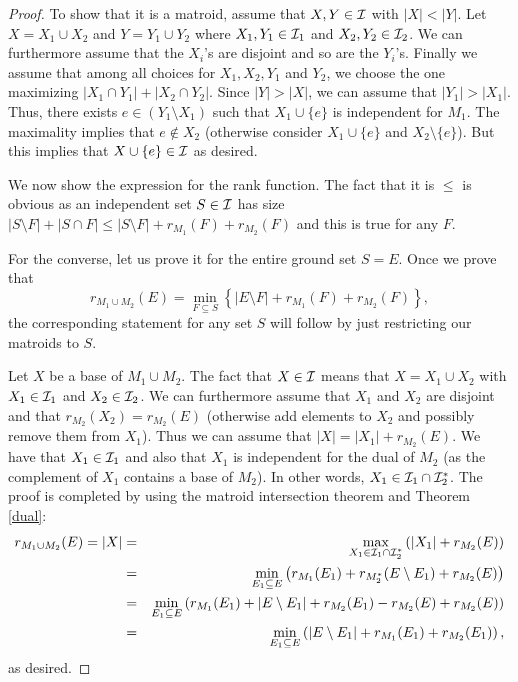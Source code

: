 \documentclass[12pt]{article}
\begin{document}
\begin{proof}
  To show that it is a matroid, assume that $X, Y \in {\cal I}$ with
  $|X|<|Y|$. Let $X=X_1\cup X_2$ and $Y=Y_1\cup Y_2$ where $X_1,
  Y_1\in {\cal I}_1$ and $X_2, Y_2\in {\cal I}_2$. We can furthermore
  assume that the $X_i$'s are disjoint and so are the $Y_i$'s. Finally
  we assume that among all choices for $X_1, X_2, Y_1$ and $Y_2$, we
  choose the one maximizing $|X_1\cap Y_1|+|X_2\cap Y_2|$. Since
  $|Y|>|X|$, we can assume that $|Y_1|>|X_1|$. Thus, there exists
  $e\in (Y_1\setminus X_1)$ such that $X_1\cup \{e\}$ is independent
  for $M_1$. The maximality implies that $e\notin X_2$ (otherwise
  consider $X_1\cup \{e\}$ and $X_2\setminus\{e\}$). But this implies
  that $X\cup \{e\}\in {\cal I}$ as desired.

We now show the expression for the rank function. The fact that it is
$\leq$ is obvious as an independent set $S\in {\cal I}$ has size
$|S\setminus F|+ |S\cap F|\leq |S\setminus F| + r_{M_1}(F)+r_{M_2}(F)$
and this is true for any $F$.

For the converse, let us prove it for the entire ground set
$S=E$. Once we  prove that 
 $$r_{M_1\cup M_2}(E)=\min_{F \subseteq S} \left\{ |E \setminus F| +
  r_{M_1}(F) + r_{M_2} (F) \right\},$$
the corresponding statement for any set $S$ will follow by just
restricting our matroids to $S$.
 
Let $X$ be a base of $M_1\cup M_2$. The fact that $X\in {\cal I}$
means that $X=X_1\cup X_2$ with $X_1\in {\cal I}_1$ and $X_2\in {\cal
  I}_2$. We can furthermore assume that $X_1$ and $X_2$ are disjoint
and that $r_{M_2}(X_2)=r_{M_2}(E)$ (otherwise add elements to $X_2$
and possibly remove them from $X_1$). Thus we can assume that
$|X|=|X_1|+ r_{M_2}(E)$. We have that $X_1\in {\cal I}_1$ and also
that $X_1$ is independent for the dual of $M_2$ (as the complement of
$X_1$ contains a base of $M_2$). In other words, $X_1\in {\cal I}_1
\cap {\cal I}^*_2$. The proof is completed by using the matroid
intersection theorem and Theorem \ref{dual}:
\begin{eqnarray*}
r_{M_1\cup M_2}(E) = |X| & = & \max_{X_1\in {\cal I}_1\cap {\cal
    I}^*_2} \left( |X_1| + r_{M_2}(E)\right) \\
& = & \min_{E_1\subseteq E} \left( r_{M_1}(E_1) + r_{M_2^*}(E\setminus
    E_1) + r_{M_2}(E)\right) \\
& = & \min_{E_1\subseteq E} \left( r_{M_1}(E_1) + |E\setminus E_1| +
    r_{M_2}(E_1)-r_{M_2}(E)  + r_{M_2}(E)\right) \\
& = & \min_{E_1\subseteq E} \left( |E\setminus E_1| + r_{M_1}(E_1) +
    r_{M_2}(E_1)\right),
\end{eqnarray*}
as desired.  
 \end{proof}
\end{document}
